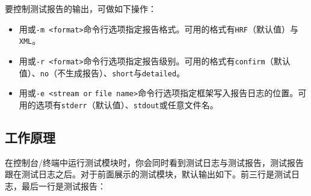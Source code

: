 
要控制测试报告的输出，可做如下操作：



\begin{itemize}
\item 用或\texttt{-\allowbreak{}m <\allowbreak{}format>}命令行选项指定报告格式。可用的格式有\texttt{HRF}（默认值）与\texttt{XML}。



\item 用或\texttt{-\allowbreak{}r <\allowbreak{}format>}命令行选项指定报告级别。可用的格式有\texttt{confirm}（默认值）、\texttt{no}（不生成报告）、\texttt{short}与\texttt{detailed}。



\item 用或\texttt{-\allowbreak{}e <\allowbreak{}stream or} \texttt{file name>}命令行选项指定框架写入报告日志的位置。可用的选项有\texttt{stderr}（默认值）、\texttt{stdout}或任意文件名。

\end{itemize}



\subsection{工作原理}



在控制台/终端中运行测试模块时，你会同时看到测试日志与测试报告，测试报告跟在测试日志之后。对于前面展示的测试模块，默认输出如下。前三行是测试日志，最后一行是测试报告：


